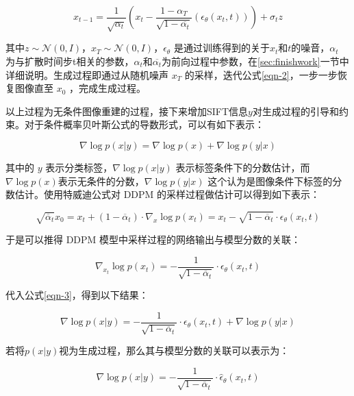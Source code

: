 \begin{equation}\label{eqn-2}
      x_{t-1}= \frac{1}{\sqrt{\alpha_t}}
      (x_t -
      \frac{1-\alpha_T}{\sqrt{1-\overline{\alpha_t}}}
      (\epsilon_\theta(x_t,t))) + \sigma_t z
\end{equation}

其中$z \sim \mathcal{N}(0,I)$，$x_T \sim \mathcal{N}(0,I)$，$\epsilon_\theta$ 是通过训练得到的关于$x_t$和$t$的噪音，$\alpha_t$ 为与扩散时间步t相关的参数，$\alpha_t$和$\overline{\alpha_t}$为前向过程中参数，在\ref{sec:finishwork}一节中详细说明。生成过程即通过从随机噪声 $x_T$ 的采样，迭代公式\eqref{eqn-2}，一步一步恢复图像直至 $x_0$ ，完成生成过程。
\par
以上过程为无条件图像重建的过程，接下来增加SIFT信息$y$对生成过程的引导和约束。对于条件概率贝叶斯公式的导数形式，可以有如下表示：

\begin{equation}\label{eqn-3}
      \nabla \log p(x|y) = \nabla \log p(x) + \nabla \log p(y|x)
\end{equation}

其中的 $y$ 表示分类标签，$\nabla \log p(x|y)$ 表示标签条件下的分数估计，而 $\nabla \log p(x)$表示无条件的分数，$\nabla \log p(y|x)$ 这个认为是图像条件下标签的分数估计。使用特威迪公式对 DDPM 的采样过程做估计可以得到如下表示：

\begin{equation}\label{eqn-4}
      \sqrt{\overline{\alpha}_t}x_0 = x_t + (1 - \overline{\alpha}_t) \cdot \nabla_x \log p(x_t) = x_t - \sqrt{1-\overline{\alpha}_t}\cdot\epsilon_\theta(x_t,t)
\end{equation}

于是可以推得 DDPM 模型中采样过程的网络输出与模型分数的关联：

\begin{equation}\label{eqn-5}
      \nabla_{x_t} \log p(x_t) = - \frac{1}{\sqrt{1-\overline{\alpha}_t}} \cdot\epsilon_\theta(x_t,t)
\end{equation}

代入公式\eqref{eqn-3}，得到以下结果：

\begin{equation}\label{eqn-6}
      \nabla \log p(x|y) = - \frac{1}{\sqrt{1-\overline{\alpha}_t}} \cdot\epsilon_\theta(x_t,t)
      + \nabla \log p(y|x)
\end{equation}

若将$p(x|y)$视为生成过程，那么其与模型分数的关联可以表示为：

\begin{equation}\label{eqn-7}
      \nabla \log p(x|y) = - \frac{1}{\sqrt{1-\overline{\alpha}_t}} \cdot\hat{\epsilon}_\theta(x_t,t)
\end{equation}

